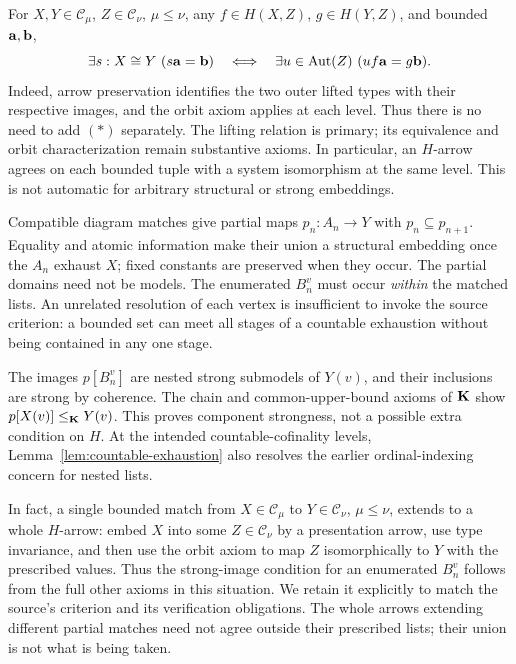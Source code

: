 \begin{remark}
\label{rem:working-orbit-invariance}
For $X,Y\in\mathcal C_\mu$, $Z\in\mathcal C_\nu$, $\mu\leq\nu$,
any $f\in H(X,Z)$, $g\in H(Y,Z)$, and bounded $\mathbf{a},\mathbf{b}$,
\[
 \exists s:X\cong Y\ (s\mathbf{a}=\mathbf{b})
 \quad\Longleftrightarrow\quad
 \exists u\in\operatorname{Aut}(Z)\ (uf\mathbf{a}=g\mathbf{b}).
\]
Indeed, arrow preservation identifies the two outer lifted types with
their respective images, and the orbit axiom applies at each level.
Thus there is no need to add $(*)$ separately. The lifting relation is
primary; its equivalence and orbit characterization remain substantive
axioms. In particular, an $H$-arrow agrees on each bounded tuple with
a system isomorphism at the same level. This is not automatic for
arbitrary structural or strong embeddings.
\end{remark}

\begin{remark}
Compatible diagram matches give partial maps $p_n:A_n\to Y$ with
$p_n\subseteq p_{n+1}$. Equality and atomic information make their union
a structural embedding once the $A_n$ exhaust $X$; fixed constants are
preserved when they occur. The partial domains need not be models.
The enumerated $B^v_n$ must occur \emph{within} the matched lists.
An unrelated resolution of each vertex is insufficient to invoke the
source criterion: a bounded set can meet all stages of a countable
exhaustion without being contained in any one stage.

The images $p[B^v_n]$ are nested strong submodels of $Y(v)$, and their
inclusions are strong by coherence. The chain and common-upper-bound
axioms of $\mathbf K$ show $p[X(v)]\leq_\mathbf K Y(v)$. This proves component
strongness, not a possible extra condition on $H$. At the intended
countable-cofinality levels, Lemma~\ref{lem:countable-exhaustion}
also resolves the earlier ordinal-indexing concern for nested lists.

In fact, a single bounded match from $X\in\mathcal C_\mu$ to
$Y\in\mathcal C_\nu$, $\mu\leq\nu$, extends to a whole $H$-arrow:
embed $X$ into some $Z\in\mathcal C_\nu$ by a presentation arrow,
use type invariance, and then use the orbit axiom to map $Z$ isomorphically
to $Y$ with the prescribed values. Thus the strong-image condition for
an enumerated $B^v_n$ follows from the full other axioms in this situation.
We retain it explicitly to match the source's criterion and its
verification obligations. The whole arrows extending different partial
matches need not agree outside their prescribed lists; their union is
not what is being taken.
\end{remark}

